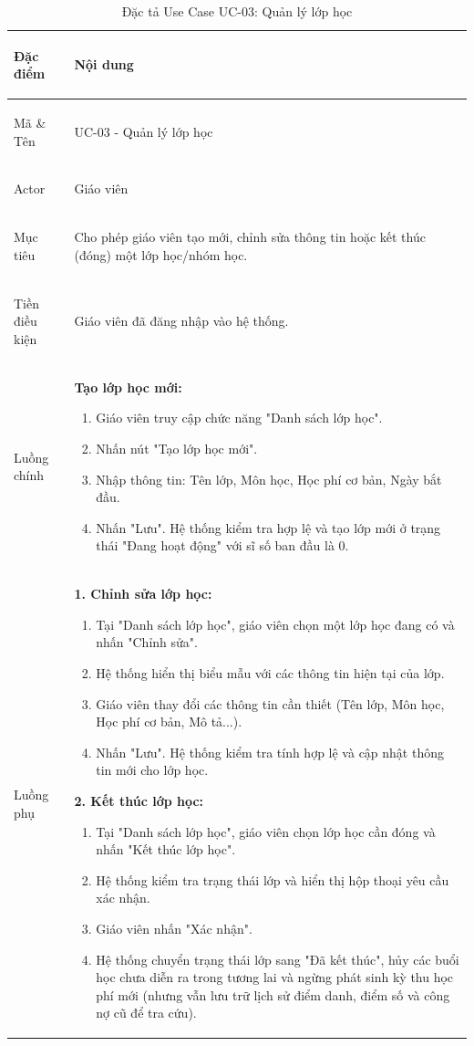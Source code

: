 \begin{table}[h!]
\centering
\small
\caption{Đặc tả Use Case UC-03: Quản lý lớp học}
\label{tab:uc03-quan-ly-lop-hoc}
\begin{tabularx}{\textwidth}{|>{\bfseries\raggedright\arraybackslash}p{2.5cm}|X|}
\hline
Đặc điểm & Nội dung \\ \hline
Mã \& Tên & UC-03 - Quản lý lớp học \\ \hline
Actor & Giáo viên \\ \hline
Mục tiêu & Cho phép giáo viên tạo mới, chỉnh sửa thông tin hoặc kết thúc (đóng) một lớp học/nhóm học. \\ \hline
Tiền điều kiện & Giáo viên đã đăng nhập vào hệ thống. \\ \hline
Luồng chính & 
\textbf{Tạo lớp học mới:}
\begin{enumerate}
    \item Giáo viên truy cập chức năng "Danh sách lớp học".
    \item Nhấn nút "Tạo lớp học mới".
    \item Nhập thông tin: Tên lớp, Môn học, Học phí cơ bản, Ngày bắt đầu.
    \item Nhấn "Lưu". Hệ thống kiểm tra hợp lệ và tạo lớp mới ở trạng thái "Đang hoạt động" với sĩ số ban đầu là 0.
\end{enumerate} \\ \hline
Luồng phụ & 
\textbf{1. Chỉnh sửa lớp học:}
\begin{enumerate}
    \item Tại "Danh sách lớp học", giáo viên chọn một lớp học đang có và nhấn "Chỉnh sửa".
    \item Hệ thống hiển thị biểu mẫu với các thông tin hiện tại của lớp.
    \item Giáo viên thay đổi các thông tin cần thiết (Tên lớp, Môn học, Học phí cơ bản, Mô tả...).
    \item Nhấn "Lưu". Hệ thống kiểm tra tính hợp lệ và cập nhật thông tin mới cho lớp học.
\end{enumerate}
\textbf{2. Kết thúc lớp học:}
\begin{enumerate}
    \item Tại "Danh sách lớp học", giáo viên chọn lớp học cần đóng và nhấn "Kết thúc lớp học".
    \item Hệ thống kiểm tra trạng thái lớp và hiển thị hộp thoại yêu cầu xác nhận.
    \item Giáo viên nhấn "Xác nhận".
    \item Hệ thống chuyển trạng thái lớp sang "Đã kết thúc", hủy các buổi học chưa diễn ra trong tương lai và ngừng phát sinh kỳ thu học phí mới (nhưng vẫn lưu trữ lịch sử điểm danh, điểm số và công nợ cũ để tra cứu).

\end{enumerate}
\end{tabularx}
\end{table}
